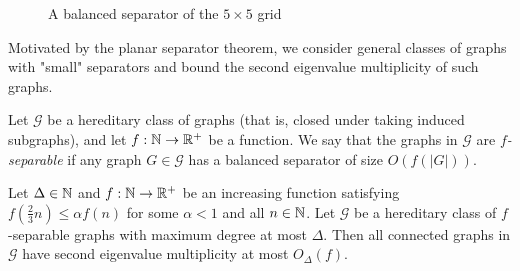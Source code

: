 \begin{figure}[ht]
    \centering
    \captionsetup{justification=centering, margin=2cm}
    \caption{A balanced separator of the $5 \times 5$ grid}
    \label{fig:separator-grid}
\end{figure}

Motivated by the planar separator theorem, we consider general classes of graphs with "small" separators and bound the second eigenvalue multiplicity of such graphs.

\begin{definition}
    Let $\mathcal{G}$ be a hereditary class of graphs (that is, closed under taking induced subgraphs), 
    and let $f : \mathbb{N} \rightarrow \mathbb{R}^+$ be a function.
    We say that the graphs in $\mathcal{G}$ are \textit{$f$-separable} if any graph $G \in \mathcal{G}$ has a balanced separator of size $O(f(|G|))$.
\end{definition}

\begin{theorem} \label{thm:separable-snd-eigval-mult}
    Let $\Delta \in \mathbb{N}$ and $f : \mathbb{N} \rightarrow \mathbb{R}^+$ be an increasing function satisfying \mbox{$f(\frac{2}{3}n) \le \alpha f(n)$} for some $\alpha < 1$ and all $n \in \mathbb{N}$.
    Let $\mathcal G$ be a hereditary class of $f$-separable graphs with maximum degree at most $\Delta$. 
    Then all connected graphs in $\mathcal G$ have second eigenvalue multiplicity at most $O_{\Delta}(f)$.
\end{theorem}

